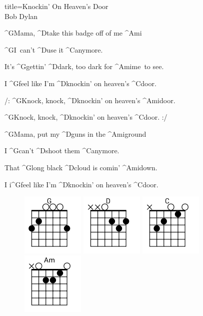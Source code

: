 \begin{song}{title=\predtitle\centering Knockin' On Heaven's Door \\\large Bob Dylan  \vspace*{-0.3cm}}  %
\begin{centerjustified}
\nejnejvetsi

\sloka
	^{G}Mama, ^{D}take this badge off of me ^{Ami}

	^{G\z}I~can't ^{D}use it ^{C}anymore.

	It's ^{G\z}gettin' ^{D\z}dark, too dark for ^{Ami\z}me~to see.

	I ^{G\z}feel like I'm ^{D\z}knockin' on heaven's ^{C\z}door.

	/: ^{G}Knock, knock, ^{D}knockin' on heaven's  ^{Ami}door.

	^{G}Knock, knock, ^{D}knockin' on heaven's  ^{C}door. :/

\sloka
	^{G}Mama, put my ^{D\z}guns in the ^{Ami\z}ground

	I ^{G\z}can't ^{D\z}shoot them ^{C}anymore.

	That ^{G}long black ^{D\z}cloud is comin' ^{Ami\z}down.

	I i^{G\z}feel like I'm ^{D\z}knockin' on heaven's ^{C\z}door.


\end{centerjustified}
\setcounter{Slokočet}{0}
\end{song}
\begin{figure}[h]
\predtitle\centering
\includegraphics[width=3cm]{../Akordy/g.png}
\includegraphics[width=3cm]{../Akordy/d.png}
\includegraphics[width=3cm]{../Akordy/c.png}
\includegraphics[width=3cm]{../Akordy/am.png}
\end{figure}
